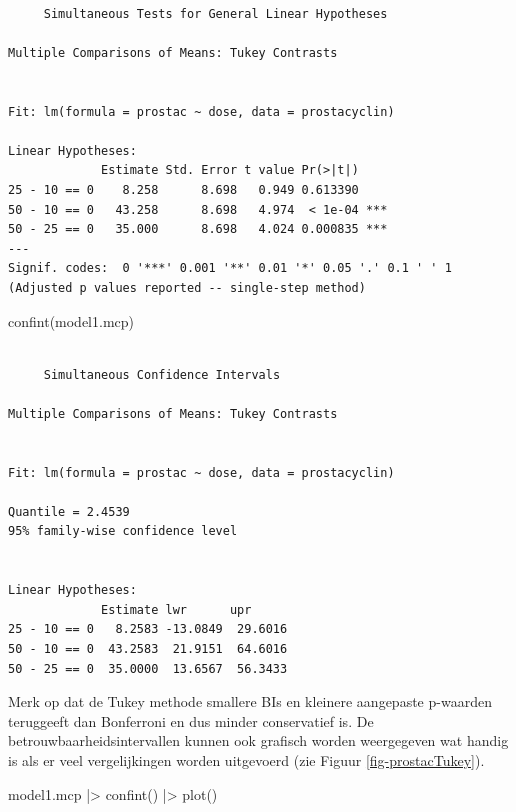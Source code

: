 \documentclass[
  dutch,
  letterpaper,
  12pt]{book}
\newenvironment{Shaded}{\begin{snugshade}}{\end{snugshade}}
\newcommand{\FunctionTok}[1]{\textcolor[rgb]{0.28,0.35,0.67}{#1}}
\newcommand{\NormalTok}[1]{\textcolor[rgb]{0.00,0.23,0.31}{#1}}
\newcommand{\SpecialCharTok}[1]{\textcolor[rgb]{0.37,0.37,0.37}{#1}}
\theoremstyle{definition}
\theoremstyle{definition}
\theoremstyle{definition}
\theoremstyle{remark}
\begin{document}
\begin{verbatim}

     Simultaneous Tests for General Linear Hypotheses

Multiple Comparisons of Means: Tukey Contrasts


Fit: lm(formula = prostac ~ dose, data = prostacyclin)

Linear Hypotheses:
             Estimate Std. Error t value Pr(>|t|)    
25 - 10 == 0    8.258      8.698   0.949 0.613390    
50 - 10 == 0   43.258      8.698   4.974  < 1e-04 ***
50 - 25 == 0   35.000      8.698   4.024 0.000835 ***
---
Signif. codes:  0 '***' 0.001 '**' 0.01 '*' 0.05 '.' 0.1 ' ' 1
(Adjusted p values reported -- single-step method)
\end{verbatim}

\begin{Shaded}
\begin{Highlighting}[]
\FunctionTok{confint}\NormalTok{(model1.mcp)}
\end{Highlighting}
\end{Shaded}

\begin{verbatim}

     Simultaneous Confidence Intervals

Multiple Comparisons of Means: Tukey Contrasts


Fit: lm(formula = prostac ~ dose, data = prostacyclin)

Quantile = 2.4539
95% family-wise confidence level
 

Linear Hypotheses:
             Estimate lwr      upr     
25 - 10 == 0   8.2583 -13.0849  29.6016
50 - 10 == 0  43.2583  21.9151  64.6016
50 - 25 == 0  35.0000  13.6567  56.3433
\end{verbatim}

Merk op dat de Tukey methode smallere BIs en kleinere aangepaste
p-waarden teruggeeft dan Bonferroni en dus minder conservatief is. De
betrouwbaarheidsintervallen kunnen ook grafisch worden weergegeven wat
handig is als er veel vergelijkingen worden uitgevoerd (zie Figuur
\ref{fig-prostacTukey}).

\begin{Shaded}
\begin{Highlighting}[]
\NormalTok{model1.mcp }\SpecialCharTok{|\textgreater{}}
  \FunctionTok{confint}\NormalTok{() }\SpecialCharTok{|\textgreater{}}
  \FunctionTok{plot}\NormalTok{()}
\end{Highlighting}
\end{Shaded}
\end{document}
